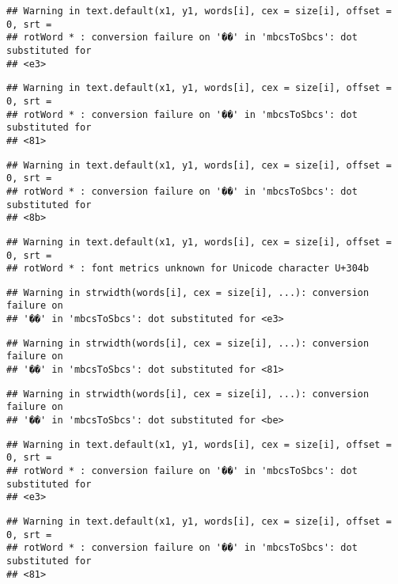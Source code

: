 \documentclass[]{article}
\begin{document}
\begin{verbatim}
## Warning in text.default(x1, y1, words[i], cex = size[i], offset = 0, srt =
## rotWord * : conversion failure on '��' in 'mbcsToSbcs': dot substituted for
## <e3>
\end{verbatim}

\begin{verbatim}
## Warning in text.default(x1, y1, words[i], cex = size[i], offset = 0, srt =
## rotWord * : conversion failure on '��' in 'mbcsToSbcs': dot substituted for
## <81>
\end{verbatim}

\begin{verbatim}
## Warning in text.default(x1, y1, words[i], cex = size[i], offset = 0, srt =
## rotWord * : conversion failure on '��' in 'mbcsToSbcs': dot substituted for
## <8b>
\end{verbatim}

\begin{verbatim}
## Warning in text.default(x1, y1, words[i], cex = size[i], offset = 0, srt =
## rotWord * : font metrics unknown for Unicode character U+304b
\end{verbatim}

\begin{verbatim}
## Warning in strwidth(words[i], cex = size[i], ...): conversion failure on
## '��' in 'mbcsToSbcs': dot substituted for <e3>
\end{verbatim}

\begin{verbatim}
## Warning in strwidth(words[i], cex = size[i], ...): conversion failure on
## '��' in 'mbcsToSbcs': dot substituted for <81>
\end{verbatim}

\begin{verbatim}
## Warning in strwidth(words[i], cex = size[i], ...): conversion failure on
## '��' in 'mbcsToSbcs': dot substituted for <be>
\end{verbatim}

\begin{verbatim}
## Warning in text.default(x1, y1, words[i], cex = size[i], offset = 0, srt =
## rotWord * : conversion failure on '��' in 'mbcsToSbcs': dot substituted for
## <e3>
\end{verbatim}

\begin{verbatim}
## Warning in text.default(x1, y1, words[i], cex = size[i], offset = 0, srt =
## rotWord * : conversion failure on '��' in 'mbcsToSbcs': dot substituted for
## <81>
\end{verbatim}
\end{document}
